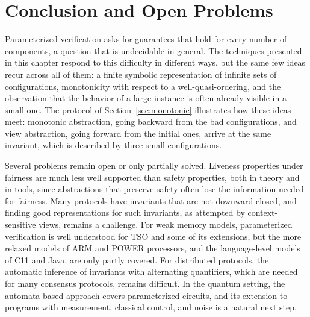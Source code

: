 \section{Conclusion and Open Problems}
\label{sec:conclusion}

Parameterized verification asks for guarantees that hold for every number of
components, a question that is undecidable in general. The techniques presented
in this chapter respond to this difficulty in different ways, but the same few
ideas recur across all of them: a finite symbolic representation of infinite
sets of configurations, monotonicity with respect to a well-quasi-ordering, and
the observation that the behavior of a large instance is often already visible
in a small one. The protocol of Section~\ref{sec:monotonic} illustrates how
these ideas meet: monotonic abstraction, going backward from the bad
configurations, and view abstraction, going forward from the initial ones,
arrive at the same invariant, which is described by three small
configurations.

Several problems remain open or only partially solved. Liveness properties
under fairness are much less well supported than safety properties, both in
theory and in tools, since abstractions that preserve safety often lose the
information needed for fairness. Many protocols have invariants that are not
downward-closed, and finding good representations for such invariants, as
attempted by context-sensitive views, remains a challenge. For weak memory
models, parameterized verification is well understood for TSO and some of its
extensions, but the more relaxed models of ARM and POWER processors, and the
language-level models of C11 and Java, are only partly covered. For distributed
protocols, the automatic inference of invariants with alternating quantifiers,
which are needed for many consensus protocols, remains difficult. In the
quantum setting, the automata-based approach covers parameterized circuits, and
its extension to programs with measurement, classical control, and noise is a
natural next step.
